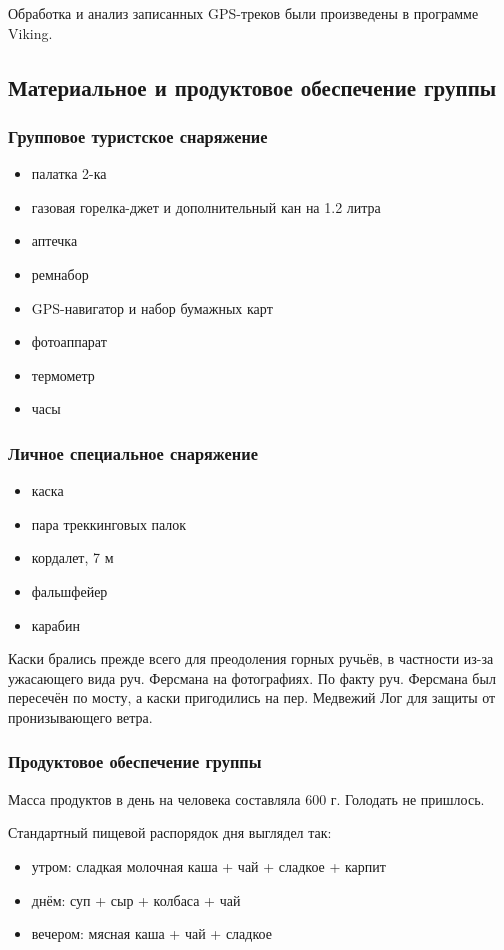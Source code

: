 Обработка и анализ записанных \textenglish{GPS}-треков были произведены в программе \textenglish{Viking}.

\subsection{Материальное и продуктовое обеспечение группы}
\subsubsection{Групповое туристское снаряжение}
\begin{itemize}
\item палатка 2-ка
\item газовая горелка-джет и дополнительный кан на 1.2 литра
\item аптечка
\item ремнабор
\item \textenglish{GPS}-навигатор и набор бумажных карт
\item фотоаппарат
\item термометр
\item часы
\end{itemize}

\subsubsection{Личное специальное снаряжение}
\begin{itemize}
\item каска
\item пара треккинговых палок
\item кордалет, 7 м
\item фальшфейер
\item карабин
\end{itemize}

Каски брались прежде всего для преодоления горных ручьёв, в частности из-за ужасающего вида руч. Ферсмана на фотографиях.
По факту руч. Ферсмана был пересечён по мосту, а каски пригодились на пер. Медвежий Лог для защиты от пронизывающего ветра.

\subsubsection{Продуктовое обеспечение группы}
Масса продуктов в день на человека составляла 600 г. Голодать не пришлось.

Стандартный пищевой распорядок дня выглядел так:
\begin{itemize}
\item утром: сладкая молочная каша + чай + сладкое + карпит
\item днём: суп + сыр + колбаса + чай
\item вечером: мясная каша + чай + сладкое
\end{itemize}

